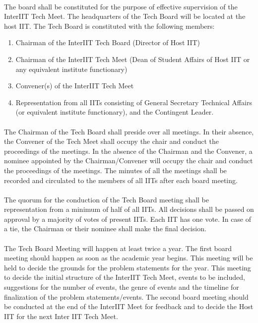 \paragraph{}
The board shall be constituted for the purpose of effective supervision of the InterIIT Tech Meet. The headquarters of the Tech Board will be located at the host IIT. The Tech Board is constituted with the following members:
\begin{enumerate}
    \item Chairman of the InterIIT Tech Board (Director of Host IIT)
    \item Chairman of the InterIIT Tech Meet (Dean of Student Affairs of Host IIT or any equivalent institute functionary)
    \item Convener(s) of the InterIIT Tech Meet
    \item Representation from all IITs consisting of General Secretary Technical Affairs (or equivalent institute functionary), and the Contingent Leader.
\end{enumerate}

\paragraph{}
The Chairman of the Tech Board shall preside over all meetings. In their absence, the Convener of the Tech Meet shall occupy the chair and conduct the proceedings of the meetings. In the absence of the Chairman and the Convener, a nominee appointed by the Chairman/Convener will occupy the chair and conduct the proceedings of the meetings. The minutes of all the meetings shall be recorded and circulated to the members of all IITs after each board meeting.

\paragraph{}
The quorum for the conduction of the Tech Board meeting shall be representation from a minimum of half of all IITs. All decisions shall be passed on approval by a majority of votes of present IITs. Each IIT has one vote. In case of a tie, the Chairman or their nominee shall make the final decision.

\paragraph{}
The Tech Board Meeting will happen at least twice a year. The first board meeting should happen as soon as the academic year begins. This meeting will be held to decide the grounds for the problem statements for the year. This meeting to decide the initial structure of the InterIIT Tech Meet, events to be included, suggestions for the number of events, the genre of events and the timeline for finalization of the problem statements/events. The second board meeting should be conducted at the end of the InterIIT Meet for feedback and to decide the Host IIT for the next Inter IIT Tech Meet.

